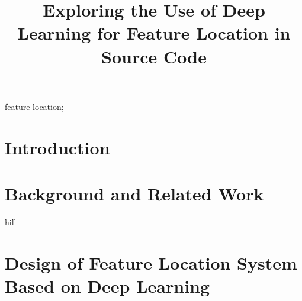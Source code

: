 \documentclass[conference]{IEEEtran}
\begin{document}
\title{Exploring the Use of Deep Learning for Feature Location in Source Code}
\author{
    \and
    \and
}


\maketitle

\begin{abstract}
\end{abstract}

\begin{IEEEkeywords}
feature location;
\end{IEEEkeywords}

\section{Introduction}
         

\section{Background and Related Work}

%



hill~\cite{hill_use_2014}

\section{Design of Feature Location System Based on Deep Learning}
\end{document}
